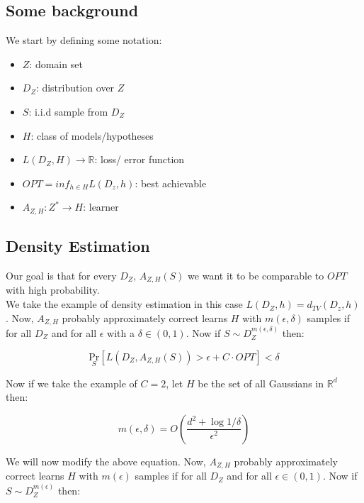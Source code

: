 \documentclass{article}
\begin{document}
\subsection{Some background}

\noindent We start by defining some notation:

\begin{itemize}
    \item $Z$: domain set
    \item $D_Z$: distribution over $Z$
    \item $S$: i.i.d sample from $D_Z$
    \item $H$: class of models/hypotheses
    \item $L(D_Z,H) \to \mathbb{R}$: loss/ error function
    \item $OPT=inf_{h \in H} L(D_z,h)$: best achievable
    \item $A_{Z,H}: Z^* \to H$: learner
\end{itemize}

\subsection{Density Estimation}

\noindent Our goal is that for every $D_Z$, $A_{Z,H}(S)$ we want it to be comparable to $OPT$ with high probability.\\

\noindent We take the example of density estimation in this case $L(D_Z, h) = d_{TV} (D_z, h)$. Now, $A_{Z,H}$ probably approximately correct learns $H$ with $m(\epsilon, \delta)$ samples if for all $D_Z$ and for all $\epsilon$ with a $\delta \in ( 0,1 )$. Now if $S \sim D_Z^{m(\epsilon, \delta)}$ then:

\begin{equation}
    \underset{S}{\mathrm{Pr}} [L(D_Z, A_{Z,H}(S)) > \epsilon + C \cdot OPT] < \delta
\end{equation}

\noindent Now if we take the example of $C=2$, let $H$ be the set of all Gaussians in $\mathbb{R}^d$ then:

\begin{equation*}
    m(\epsilon, \delta) = O \left( \frac{d^2 + \log 1/\delta}{\epsilon^2} \right)
\end{equation*}

\noindent We will now modify the above equation. Now, $A_{Z,H}$ probably approximately correct learns $H$ with $m(\epsilon)$ samples if for all $D_Z$ and for all $\epsilon \in ( 0,1 )$. Now if $S \sim D_Z^{m(\epsilon)}$ then:
\end{document}
